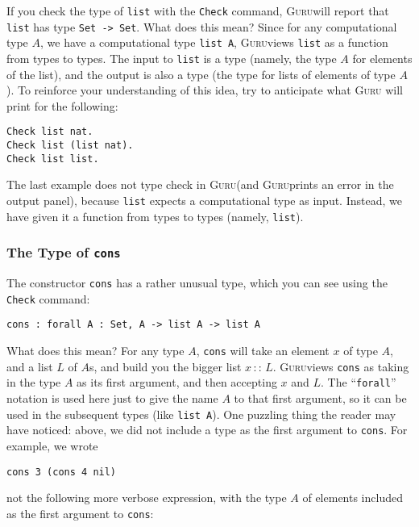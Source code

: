\documentclass{book}[12pt]
\newcommand{\guru}[0]{\textsc{Guru}}
\begin{document}
If you check the type of \texttt{list} with the \texttt{Check}
command, \guru will report that \texttt{list} has type \texttt{Set ->
Set}.  What does this mean?  Since for any computational type $A$, we
have a computational type \texttt{list A}, \guru views \texttt{list} as
a function from types to types.  The input to \texttt{list} is a type
(namely, the type $A$ for elements of the list), and the output is
also a type (the type for lists of elements of type $A$).  To
reinforce your understanding of this idea, try to anticipate what \guru
will print for the following:

\begin{verbatim}
Check list nat.
Check list (list nat).
Check list list.
\end{verbatim}

\noindent The last example does not type check in \guru (and \guru prints
an error in the output panel), because \texttt{list} expects a
computational type as input.  Instead, we have given it a function
from types to types (namely, \texttt{list}).

\subsubsection{The Type of \texttt{cons}}

The constructor \texttt{cons} has a rather unusual type, which you
can see using the \texttt{Check} command:

\begin{verbatim}
cons : forall A : Set, A -> list A -> list A
\end{verbatim}

\noindent What does this mean?  For any type $A$, \texttt{cons} will
take an element $x$ of type $A$, and a list $L$ of $A$s, and build you
the bigger list $x\, ::\, L$.  \guru views \texttt{cons} as taking in
the type $A$ as its first argument, and then accepting $x$ and $L$.
The ``\texttt{forall}'' notation is used here just to give the name
$A$ to that first argument, so it can be used in the subsequent types
(like \texttt{list A}).  One puzzling thing the reader may have
noticed: above, we did not include a type as the first argument to
\texttt{cons}.  For example, we wrote

\begin{verbatim}
cons 3 (cons 4 nil)
\end{verbatim}

\noindent not the following more verbose expression, with the type $A$
of elements included as the first argument to \texttt{cons}:
\end{document}

